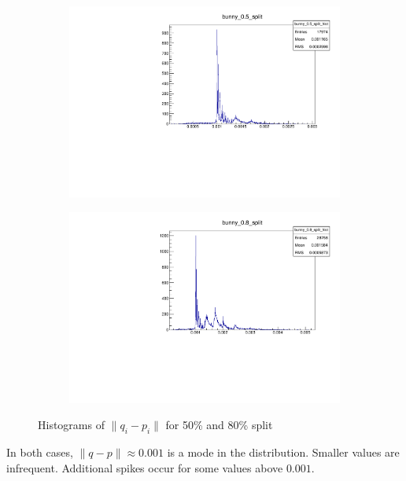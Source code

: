 \begin{figure}[h]
\centering
\begin{subfigure}{.5\textwidth}
\includegraphics[width=\linewidth]{fig/bunny_05_split.pdf}
\end{subfigure}%
\begin{subfigure}{.5\textwidth}
\includegraphics[width=\linewidth]{fig/bunny_08_split.pdf}
\end{subfigure}
\caption{Histograms of $\|q_i - p_i\|$ for 50\% and 80\% split}
\label{fig:bunny_fexp_before}
\end{figure}

In both cases, $\| q - p \| \approx 0.001$ is a mode in the distribution. Smaller values are infrequent. Additional spikes occur for some values above $0.001$. 

